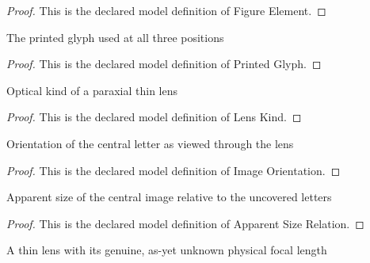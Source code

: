 \begin{proof}
  This is the declared model definition of Figure Element.
\end{proof}
\begin{definition}
  \label{def:physics:phyx-mini-0149:phyxminiproblems-problemphyxmini0149-printedglyph}
  The printed glyph used at all three positions
\end{definition}
\begin{proof}
  This is the declared model definition of Printed Glyph.
\end{proof}
\begin{definition}
  \label{def:physics:phyx-mini-0149:phyxminiproblems-problemphyxmini0149-lenskind}
  Optical kind of a paraxial thin lens
\end{definition}
\begin{proof}
  This is the declared model definition of Lens Kind.
\end{proof}
\begin{definition}
  \label{def:physics:phyx-mini-0149:phyxminiproblems-problemphyxmini0149-imageorientation}
  Orientation of the central letter as viewed through the lens
\end{definition}
\begin{proof}
  This is the declared model definition of Image Orientation.
\end{proof}
\begin{definition}
  \label{def:physics:phyx-mini-0149:phyxminiproblems-problemphyxmini0149-apparentsizerelation}
  Apparent size of the central image relative to the uncovered letters
\end{definition}
\begin{proof}
  This is the declared model definition of Apparent Size Relation.
\end{proof}
\begin{definition}
  \label{def:physics:phyx-mini-0149:phyxminiproblems-problemphyxmini0149-thinlens}
  A thin lens with its genuine, as-yet unknown physical focal length
\end{definition}
